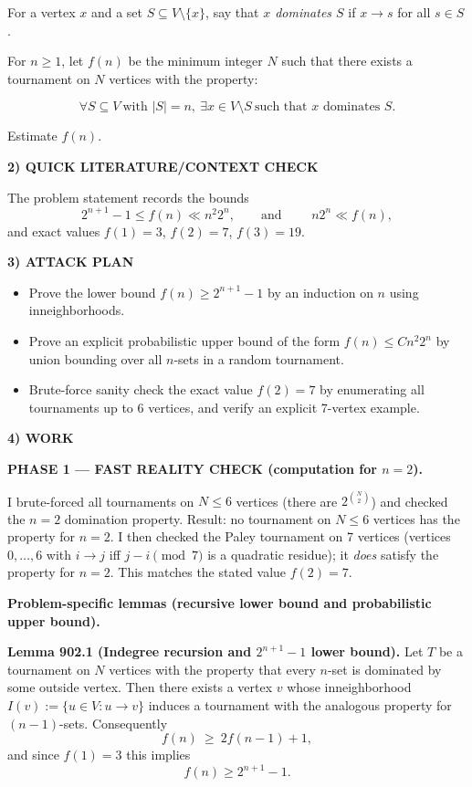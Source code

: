 For a vertex $x$ and a set $S\subseteq V\setminus\{x\}$, say that \emph{$x$
dominates $S$} if $x\to s$ for all $s\in S$.

For $n\ge 1$, let $f(n)$ be the minimum integer $N$ such that there exists a
tournament on $N$ vertices with the property:

\[ \forall S\subseteq V\ \text{with }|S|=n,\ \exists x\in V\setminus S\ \text{such that }x\text{ dominates }S. \]

Estimate $f(n)$.

\medskip
\noindent\textbf{2) QUICK LITERATURE/CONTEXT CHECK}

The problem statement records the bounds
\[2^{n+1}-1\le f(n)\ll n^2 2^n,\qquad\text{and }\qquad n2^n\ll f(n),
\]
and exact values $f(1)=3$, $f(2)=7$, $f(3)=19$.

\medskip
\noindent\textbf{3) ATTACK PLAN}

\begin{itemize}
\item Prove the lower bound $f(n)\ge 2^{n+1}-1$ by an induction on $n$ using
inneighborhoods.
\item Prove an explicit probabilistic upper bound of the form
$f(n)\le C n^2 2^n$ by union bounding over all $n$-sets in a random tournament.
\item Brute-force sanity check the exact value $f(2)=7$ by enumerating all
tournaments up to 6 vertices, and verify an explicit 7-vertex example.
\end{itemize}

\medskip
\noindent\textbf{4) WORK}

\textbf{PHASE 1 — FAST REALITY CHECK (computation for $n=2$).}

I brute-forced all tournaments on $N\le 6$ vertices (there are $2^{\binom{N}{2}}$)
and checked the $n=2$ domination property.
Result: no tournament on $N\le 6$ vertices has the property for $n=2$.
I then checked the Paley tournament on 7 vertices (vertices $0,\dots,6$ with
$i\to j$ iff $j-i\pmod 7$ is a quadratic residue); it \emph{does} satisfy the
property for $n=2$.
This matches the stated value $f(2)=7$.

\medskip
\textbf{Problem-specific lemmas (recursive lower bound and probabilistic upper bound).}

\medskip
\noindent\textbf{Lemma 902.1 (Indegree recursion and $2^{n+1}-1$ lower bound).}
Let $T$ be a tournament on $N$ vertices with the property that every $n$-set is
dominated by some outside vertex. Then there exists a vertex $v$ whose
inneighborhood $I(v):=\{u\in V: u\to v\}$ induces a tournament with the analogous
property for $(n-1)$-sets.
Consequently
\[ f(n)\ \ge\ 2 f(n-1)+1, \]
and since $f(1)=3$ this implies
\[ f(n)\ge 2^{n+1}-1. \]

